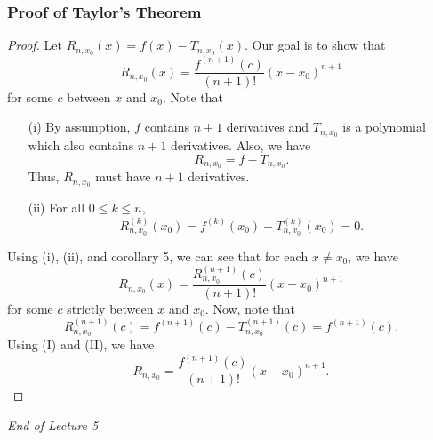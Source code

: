 \subsubsection{Proof of Taylor's Theorem}
\begin{proof}
Let \( {R}_{n,{x}_{0}}(x) = f(x) - {T}_{n,{x}_{0}}(x)  \). Our goal is to show that 
\[  {R}_{n,{x}_{0}}(x) = \frac{ f^{(n+1)}(c) }{ (n+1)! } (x - {x}_{0})^{n+1} \]
for some \( c  \) between \( x  \) and \( {x}_{0} \). Note that 
\begin{enumerate}
    \item[(i)] By assumption, \( f \) contains \( n + 1  \) derivatives and \( {T}_{n,{x}_{0}}  \) is a polynomial which also contains \( n + 1  \) derivatives. Also, we have 
        \[  {R}_{n,{x}_{0}} = f - {T}_{n,{x}_{0}}. \]
        Thus, \( {R}_{n,{x}_{0}}  \) must have \( n + 1  \) derivatives.
    \item[(ii)] For all \( 0 \leq k \leq n  \),
        \[  {R}_{n, {x}_{0}}^{(k)}({x}_{0}) = f^{(k)}({x}_{0}) - {T}_{n,{x}_{0}}^{(k)}({x}_{0}) = 0. \]
\end{enumerate}
Using (i), (ii), and corollary 5, we can see that for each \( x \neq {x}_{0} \), we have 
\[  R_{n,{x}_{0}}(x) = \frac{ {R}_{n,{x}_{0}}^{(n+1)}(c) }{ (n+1)! }  (x - {x}_{0})^{n+1} \tag{I} \]
for some \( c  \) strictly between \( x  \) and \( {x}_{0} \). Now, note that 
\[  {R}_{n,{x}_{0}}^{(n+1)}(c) = f^{(n+1)}(c) - {T}_{n,{x}_{0}}^{(n+1)}(c) = f^{(n+1)}(c). \tag{II}  \]
Using (I) and (II), we have 
\[  {R}_{n,{x}_{0}} = \frac{ f^{(n+1)}(c) }{ (n+1)! } (x - {x}_{0})^{n+1}.\]
\end{proof}


\begin{center}
    \textit{End of Lecture 5} 
\end{center}

